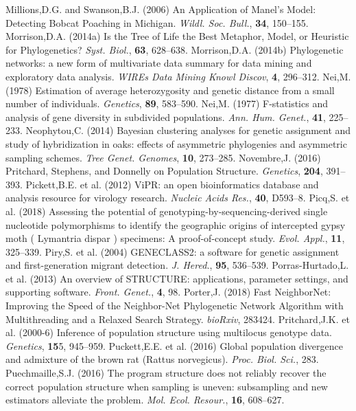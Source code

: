 \documentclass[final]{bioinfo}
\begin{document}
\begin{thebibliography}{}
\bibitem[a ()]{}Millions,D.G. and Swanson,B.J. (2006) An Application of Manel’s Model: Detecting Bobcat Poaching in Michigan. \textit{Wildl. Soc. Bull.}, \textbf{34}, 150–155.
\bibitem[a ()]{}Morrison,D.A. (2014a) Is the Tree of Life the Best Metaphor, Model, or Heuristic for Phylogenetics? \textit{Syst. Biol.}, \textbf{63}, 628–638.
\bibitem[a ()]{}Morrison,D.A. (2014b) Phylogenetic networks: a new form of multivariate data summary for data mining and exploratory data analysis. \textit{WIREs Data Mining Knowl Discov}, \textbf{4}, 296–312.
\bibitem[a ()]{}Nei,M. (1978) Estimation of average heterozygosity and genetic distance from a small number of individuals. \textit{Genetics}, \textbf{89}, 583–590.
\bibitem[a ()]{}Nei,M. (1977) F-statistics and analysis of gene diversity in subdivided populations. \textit{Ann. Hum. Genet.}, \textbf{41}, 225–233.
\bibitem[a ()]{}Neophytou,C. (2014) Bayesian clustering analyses for genetic assignment and study of hybridization in oaks: effects of asymmetric phylogenies and asymmetric sampling schemes. \textit{Tree Genet. Genomes}, \textbf{10}, 273–285.
\bibitem[a ()]{}Novembre,J. (2016) Pritchard, Stephens, and Donnelly on Population Structure. \textit{Genetics}, \textbf{204}, 391–393.
\bibitem[a ()]{}Pickett,B.E. et al. (2012) ViPR: an open bioinformatics database and analysis resource for virology research. \textit{Nucleic Acids Res.}, \textbf{40}, D593–8.
\bibitem[a ()]{}Picq,S. et al. (2018) Assessing the potential of genotyping-by-sequencing-derived single nucleotide polymorphisms to identify the geographic origins of intercepted gypsy moth ( Lymantria dispar ) specimens: A proof-of-concept study. \textit{Evol. Appl.},\textbf{ 11}, 325–339.
\bibitem[a ()]{}Piry,S. et al. (2004) GENECLASS2: a software for genetic assignment and first-generation migrant detection. \textit{J. Hered.}, \textbf{95}, 536–539.
\bibitem[a ()]{}Porras-Hurtado,L. et al. (2013) An overview of STRUCTURE: applications, parameter settings, and supporting software. \textit{Front. Genet.}, \textbf{4}, 98.
\bibitem[a ()]{}Porter,J. (2018) Fast NeighborNet: Improving the Speed of the Neighbor-Net Phylogenetic Network Algorithm with Multithreading and a Relaxed Search Strategy. \textit{bioRxiv}, 283424.
\bibitem[a ()]{}Pritchard,J.K. et al. (2000-6) Inference of population structure using multilocus genotype data. \textit{Genetics}, \textbf{15}5, 945–959.
\bibitem[a ()]{}Puckett,E.E. et al. (2016) Global population divergence and admixture of the brown rat (Rattus norvegicus). \textit{Proc. Biol. Sci.}, 283.
\bibitem[a ()]{}Puechmaille,S.J. (2016) The program structure does not reliably recover the correct population structure when sampling is uneven: subsampling and new estimators alleviate the problem. \textit{Mol. Ecol. Resour.}, \textbf{16}, 608–627.

\end{thebibliography}
\end{document}
